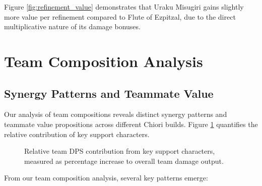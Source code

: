 \documentclass[12pt,a4paper]{article}
\begin{document}
Figure \ref{fig:refinement_value} demonstrates that Uraku Misugiri gains slightly more value per refinement compared to Flute of Ezpitzal, due to the direct multiplicative nature of its damage bonuses.

\section{Team Composition Analysis}

\subsection{Synergy Patterns and Teammate Value}

Our analysis of team compositions reveals distinct synergy patterns and teammate value propositions across different Chiori builds. Figure \ref{fig:teammate_value} quantifies the relative contribution of key support characters.

\begin{figure}[H]
\centering
{}
\caption{Relative team DPS contribution from key support characters, measured as percentage increase to overall team damage output.}
\label{fig:teammate_value}
\end{figure}

From our team composition analysis, several key patterns emerge:
\end{document}
